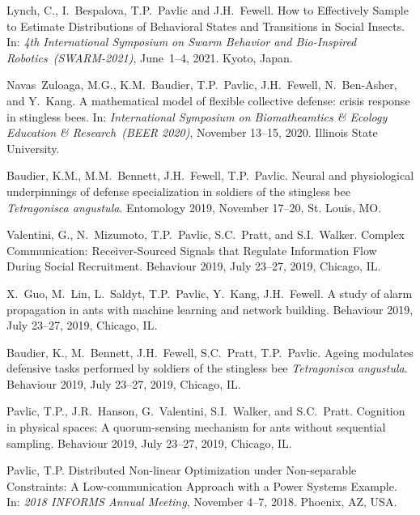\documentclass[10pt]{article}
\begin{document}
\begin{bibenum}
    \item Lynch, C., I.~Bespalova, T.P.~Pavlic and J.H.~Fewell.
        How to Effectively Sample to Estimate Distributions of
        Behavioral States and Transitions in Social Insects.
        In: \emph{4th International Symposium on
        Swarm Behavior and Bio-Inspired Robotics~(SWARM-2021)},
        June~1--4, 2021. Kyoto, Japan.

    \item Navas~Zuloaga, M.G., K.M.~Baudier, T.P.~Pavlic, J.H.~Fewell,
        N.~Ben-Asher, and Y.~Kang. A mathematical model of flexible
        collective defense: crisis response in stingless bees. In:
        \emph{International Symposium on Biomatheamtics \& Ecology
        Education \& Research~(BEER 2020)}, November 13--15, 2020.
        Illinois State University.

    \item Baudier, K.M., M.M.~Bennett, J.H.~Fewell, T.P.~Pavlic. Neural
        and physiological underpinnings of defense specialization in
        soldiers of the stingless bee \emph{Tetragonisca angustula}.
        Entomology 2019, November 17--20, St. Louis, MO.

    \item Valentini, G., N.~Mizumoto, T.P.~Pavlic, S.C.~Pratt, and
        S.I.~Walker. Complex Communication: Receiver-Sourced Signals
        that Regulate Information Flow During Social Recruitment.
        Behaviour 2019, July 23--27, 2019, Chicago, IL.

    \item X.~Guo, M.~Lin, L.~Saldyt, T.P.~Pavlic, Y.~Kang, J.H.~Fewell. A
        study of alarm propagation in ants with machine learning and
        network building. Behaviour 2019, July 23--27, 2019, Chicago,
        IL.

    \item Baudier, K., M.~Bennett, J.H.~Fewell, S.C.~Pratt, T.P.~Pavlic.
        Ageing modulates defensive tasks performed by soldiers of the
        stingless bee \emph{Tetragonisca angustula}. Behaviour 2019, July
        23--27, 2019, Chicago, IL.

    \item Pavlic, T.P., J.R.~Hanson, G.~Valentini, S.I.~Walker, and
        S.C.~Pratt. Cognition in physical spaces: A quorum-sensing
        mechanism for ants without sequential sampling. Behaviour 2019,
        July 23--27, 2019, Chicago, IL.

    \item Pavlic, T.P. Distributed Non-linear Optimization under
        Non-separable Constraints: A Low-communication Approach with a
        Power Systems Example. In: \emph{2018 INFORMS Annual Meeting},
        November 4--7, 2018. Phoenix, AZ, USA.


\end{bibenum}
\end{document}
